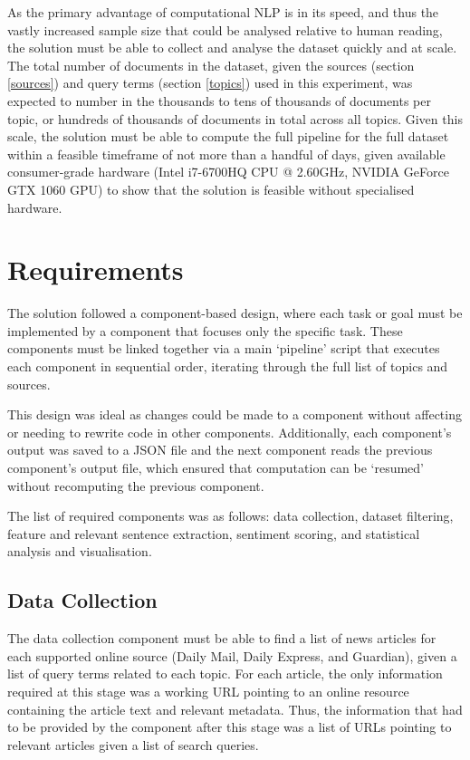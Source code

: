 \documentclass{report}
\begin{document}
As the primary advantage of computational NLP is in its speed, and thus the vastly increased sample size that could be analysed relative to human reading, the solution must be able to collect and analyse the dataset quickly and at scale.
The total number of documents in the dataset, given the sources (section \ref{sources}) and query terms (section \ref{topics}) used in this experiment, was expected to number in the thousands to tens of thousands of documents per topic, or hundreds of thousands of documents in total across all topics.
Given this scale, the solution must be able to compute the full pipeline for the full dataset within a feasible timeframe of not more than a handful of days, given available consumer-grade hardware (Intel i7-6700HQ CPU @ 2.60GHz, NVIDIA GeForce GTX 1060 GPU) to show that the solution is feasible without specialised hardware.

\section{Requirements} \label{Requirements}

The solution followed a component-based design, where each task or goal must be implemented by a component that focuses only the specific task.
These components must be linked together via a main `pipeline' script that executes each component in sequential order, iterating through the full list of topics and sources.

This design was ideal as changes could be made to a component without affecting or needing to rewrite code in other components.
Additionally, each component's output was saved to a JSON \cite{rfc8259} file and the next component reads the previous component's output file, which ensured that computation can be `resumed' without recomputing the previous component.

The list of required components was as follows: data collection, dataset filtering, feature and relevant sentence extraction, sentiment scoring, and statistical analysis and visualisation.


\subsection{Data Collection} \label{req-data-collection}  %

The data collection component must be able to find a list of news articles for each supported online source (Daily Mail, Daily Express, and Guardian), given a list of query terms related to each topic.
For each article, the only information required at this stage was a working URL pointing to an online resource containing the article text and relevant metadata.
Thus, the information that had to be provided by the component after this stage was a list of URLs pointing to relevant articles given a list of search queries.
\end{document}
